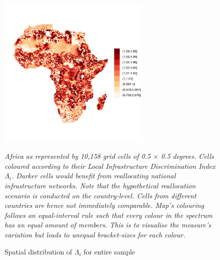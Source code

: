 \documentclass[11pt, oneside]{article}   	%
\newcommand{\mysubcaption}[1]{
\justify
\begin{spacing}{0.7}
\textit{\footnotesize #1}
\end{spacing}}
\begin{document}
\begin{figure}[!ph]
\centering
\caption{Spatial distribution of $\Lambda_{i}$ for entire sample}
\includegraphics[width=0.65\textwidth,trim={2cm 7cm 1cm 8cm},clip]{../../Analysis/output/zeta_heatmaps/African_gridcells_zeta.png}

\label{fig:all_gridcells_by_zeta}
\mysubcaption{Africa as represented by 10,158 grid cells of 0.5 $\times$ 0.5 degrees. Cells coloured according to their Local Infrastructure Discrimination Index $\Lambda_{i}$. Darker cells would benefit from reallocating national infrastructure networks. Note that the hypothetical reallocation scenario is conducted on the country-level. Cells from different countries are hence not immediately comparable. Map's colouring follows an equal-interval rule such that every colour in the spectrum has an equal amount of members. This is to visualise the measure's variation but leads to unequal bracket-sizes for each colour.}
\end{figure}
\end{document}
